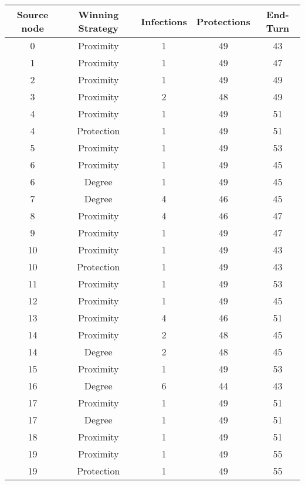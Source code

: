 \documentclass[results.tex]{subfiles}
\begin{document}
\begin{center}
  \begin{tabular}{| c || c | c | c | c |}
    \hline
    {\bfseries Source node} & {\bfseries Winning Strategy} & {\bfseries Infections} & {\bfseries Protections} & {\bfseries End-Turn} \\  %
    \hline\hline
    0 & Proximity & 1 & 49 & 43 \\ 
    \hline
    1 & Proximity & 1 & 49 & 47 \\ 
    \hline
    2 & Proximity & 1 & 49 & 49 \\ 
    \hline
    3 & Proximity & 2 & 48 & 49 \\ 
    \hline
    4 & Proximity & 1 & 49 & 51 \\ 
    \hline
    4 & Protection & 1 & 49 & 51 \\ 
    \hline
    5 & Proximity & 1 & 49 & 53 \\ 
    \hline
    6 & Proximity & 1 & 49 & 45 \\ 
    \hline
    6 & Degree & 1 & 49 & 45 \\ 
    \hline
    7 & Degree & 4 & 46 & 45 \\ 
    \hline
    8 & Proximity & 4 & 46 & 47 \\ 
    \hline
    9 & Proximity & 1 & 49 & 47 \\ 
    \hline
    10 & Proximity & 1 & 49 & 43 \\ 
    \hline
    10 & Protection & 1 & 49 & 43 \\ 
    \hline
    11 & Proximity & 1 & 49 & 53 \\ 
    \hline
    12 & Proximity & 1 & 49 & 45 \\ 
    \hline
    13 & Proximity & 4 & 46 & 51 \\ 
    \hline
    14 & Proximity & 2 & 48 & 45 \\ 
    \hline
    14 & Degree & 2 & 48 & 45 \\ 
    \hline
    15 & Proximity & 1 & 49 & 53 \\ 
    \hline
    16 & Degree & 6 & 44 & 43 \\ 
    \hline
    17 & Proximity & 1 & 49 & 51 \\ 
    \hline
    17 & Degree & 1 & 49 & 51 \\ 
    \hline
    18 & Proximity & 1 & 49 & 51 \\ 
    \hline
    19 & Proximity & 1 & 49 & 55 \\ 
    \hline
    19 & Protection & 1 & 49 & 55 \\ 

\end{tabular}
\end{center}
\end{document}
